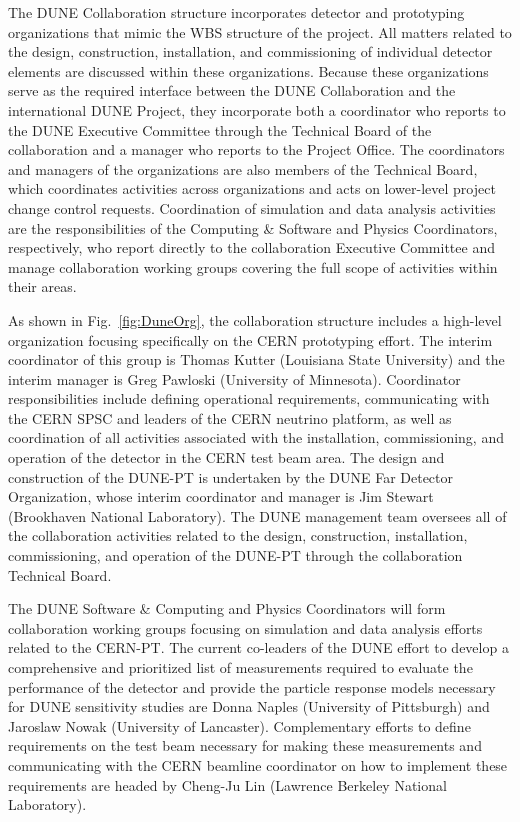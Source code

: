 The DUNE Collaboration structure incorporates detector and prototyping organizations that mimic the WBS structure of the project.  
All matters related to the design, construction, installation, and commissioning of individual detector elements are discussed 
within these organizations.  Because these organizations serve as the required interface between the DUNE Collaboration and the 
international DUNE Project, they incorporate both a coordinator who reports to the DUNE Executive Committee through the Technical
Board of the collaboration and a manager who reports to the Project Office.  The coordinators and managers of the organizations  
are also members of the Technical Board, which coordinates activities across organizations and acts on lower-level project change 
control requests.  Coordination of simulation and data analysis activities are the responsibilities of the Computing \& Software 
and Physics Coordinators, respectively, who report directly to the collaboration Executive Committee and manage collaboration 
working groups covering the full scope of activities within their areas.     

As shown in Fig.~\ref{fig:DuneOrg}, the collaboration structure includes a high-level organization focusing specifically on the 
CERN prototyping effort.  The interim coordinator of this group is Thomas Kutter (Louisiana State University) and the interim 
manager is Greg Pawloski (University of Minnesota).  Coordinator responsibilities include defining operational requirements, 
communicating with the CERN SPSC and leaders of the CERN neutrino platform, as well as coordination of all activities associated 
with the installation, commissioning, and operation of the detector in the CERN test beam area.  The design and construction of 
the DUNE-PT is undertaken by the DUNE Far Detector Organization, whose interim coordinator and manager is Jim Stewart (Brookhaven 
National Laboratory).  The DUNE management team oversees all of the collaboration activities related to the design, construction, 
installation, commissioning, and operation of the DUNE-PT through the collaboration Technical Board.

The DUNE Software \& Computing and Physics Coordinators will form collaboration working groups focusing on simulation and data 
analysis efforts related to the CERN-PT.  The current co-leaders of the DUNE effort to develop a comprehensive and prioritized 
list of measurements required to evaluate the performance of the detector and provide the particle response models necessary for 
DUNE sensitivity studies are Donna Naples (University of Pittsburgh) and Jaroslaw Nowak (University of Lancaster).  Complementary 
efforts to define requirements on the test beam necessary for making these measurements and communicating with the CERN beamline 
coordinator on how to implement these requirements are headed by Cheng-Ju Lin (Lawrence Berkeley National Laboratory).  

